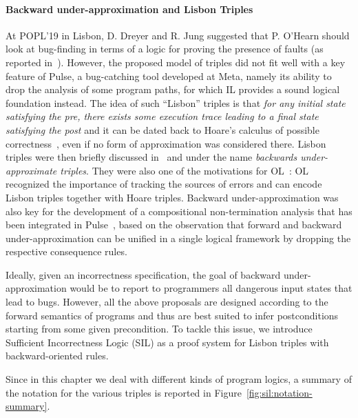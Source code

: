 \paragraph{Backward under-approximation and Lisbon Triples}
At POPL'19 in Lisbon, D. Dreyer and R. Jung suggested that P. O'Hearn should look at bug-finding in terms of a logic for proving the presence of faults (as reported in~\cite{OHearn20,ZDS23}).
However, the proposed model of triples did not fit well with a key feature of Pulse, a bug-catching tool developed at Meta, namely its ability to drop the analysis of some program paths, for which IL provides a sound logical foundation instead.
The idea of such ``Lisbon'' triples is that \emph{for any initial state satisfying the pre, there exists some execution trace leading to a final state satisfying the post} and it can be dated back to Hoare's calculus of possible correctness~\cite{Hoare78}, even if no form of approximation was considered there.
Lisbon triples were then briefly discussed in~\cite[\S 5]{MOH21} and \cite[\S 3.2]{LRVBDO22} under the name \emph{backwards under-approximate triples}. They were also one of the motivations for OL~\cite{ZDS23}: OL recognized the importance of tracking the sources of errors and can encode Lisbon triples together with Hoare triples.
Backward under-approximation was also key for the development of a compositional non-termination analysis that has been integrated in Pulse~\cite{RVO24}, based on the observation that forward and backward under-approximation can be unified in a single logical framework by dropping the respective consequence rules.

Ideally, given an incorrectness specification, the goal of backward under-approximation would be to report to programmers all dangerous input states that lead to bugs.
However, all the above proposals are designed according to the forward semantics of programs and thus are best suited to infer postconditions starting from some given precondition. %
To tackle this issue, we introduce Sufficient Incorrectness Logic (SIL) as a proof system for Lisbon triples with backward\hyp{}oriented rules.

Since in this chapter we deal with different kinds of program logics, a summary of the notation for the various triples is reported in Figure~\ref{fig:sil:notation-summary}.

